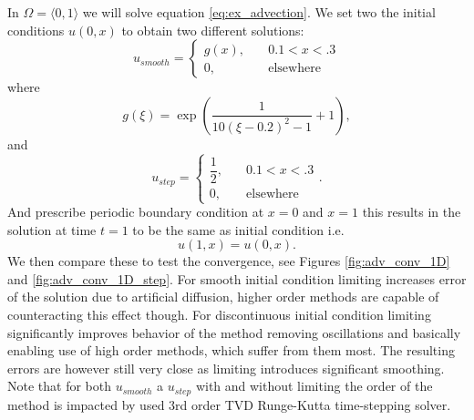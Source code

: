 \begin{example}[Advection 1D]
\label{ex:adv1D}
In $\Omega = \langle 0, 1 \rangle$ we will solve equation \eqref{eq:ex_advection}.
We set two the initial conditions $u(0, x)$ to obtain two different solutions:
\begin{equation}
u_{smooth} = \begin{cases}
g(x),\quad &0.1 < x < .3\\
0, \quad &\text{elsewhere}
\end{cases}
\end{equation}
where
\begin{equation}
g(\xi) = \exp\left(\frac{1}{10(\xi - 0.2)^2 - 1}+ 1\right),
\end{equation}
and
\begin{equation}
u_{step} = \begin{cases}
\dfrac{1}{2},\quad &0.1 < x < .3\\
0, \quad &\text{elsewhere}
\end{cases}.
\end{equation}
And prescribe periodic boundary condition at $x = 0 $ and $x = 1$  this 
results in the solution at time $t = 1$ to be the same as initial condition 
i.e.
\begin{equation}
u(1, x) = u(0, x).
\end{equation} 
We then compare these to test the convergence, see Figures 
\ref{fig:adv_conv_1D} and \ref{fig:adv_conv_1D_step}. For smooth initial condition 
limiting increases error of the solution due to artificial diffusion, higher order 
methods are capable of counteracting this effect though. For discontinuous initial 
condition limiting significantly improves behavior of the method removing oscillations 
and basically enabling use of high order methods, which suffer from them most. The 
resulting errors are however still very close as limiting introduces significant 
smoothing. Note that for both $u_{smooth}$ a $u_{step}$ with and without limiting the 
order of the method is impacted by used 3rd order TVD Runge-Kutta time-stepping solver.
\end{example}


